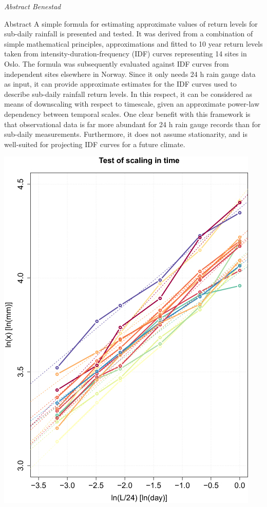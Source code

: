 \documentclass[
]{book}
\begin{document}
\emph{Abstract Benestad}

Abstract
A simple formula for estimating approximate values of return levels for sub-daily rainfall is
presented and tested. It was derived from a combination of simple mathematical principles,
approximations and fitted to 10 year return levels taken from intensity-duration-frequency (IDF)
curves representing 14 sites in Oslo. The formula was subsequently evaluated against IDF curves
from independent sites elsewhere in Norway. Since it only needs 24 h rain gauge data as input, it
can provide approximate estimates for the IDF curves used to describe sub-daily rainfall return
levels. In this respect, it can be considered as means of downscaling with respect to timescale, given
an approximate power-law dependency between temporal scales. One clear benefit with this
framework is that observational data is far more abundant for 24 h rain gauge records than for
sub-daily measurements. Furthermore, it does not assume stationarity, and is well-suited for
projecting IDF curves for a future climate.

\includegraphics{fig/Benestad_Timescaling.jpg}
\end{document}
